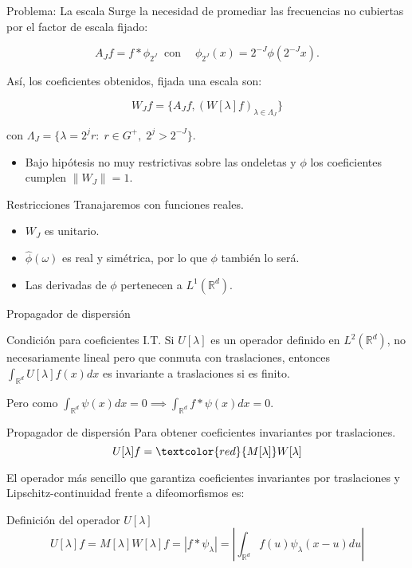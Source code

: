 \documentclass[aspectratio=43]{beamer}
\begin{document}
\begin{frame}{Problema: La escala}
  Surge la necesidad de promediar las frecuencias no cubiertas por el factor de escala fijado:

  \begin{equation*}
    A_Jf=f \ast \phi_ {2^J} \; \; \text{con} \quad \; \phi_ {2^J}(x)=2^{-J} \phi(2^{-J}x).
  \end{equation*}

  Así, los coeficientes obtenidos, fijada una escala son:

  $$W_J f=\lbrace A_Jf,(W[\lambda]f)_{\lambda \in \Lambda_J} \rbrace$$

  con $\Lambda_J=\lbrace \lambda=2^jr:\;r\in G^{+}, \; 2^j>2^{-J}\rbrace$.

  \begin{itemize}
    \item Bajo hipótesis no muy restrictivas sobre las ondeletas y $\phi$ los coeficientes cumplen $\| W_J \|=1$.
  \end{itemize}
\end{frame}

\begin{frame}{Restricciones}
  Tranajaremos con funciones reales.
  \begin{itemize}
    \item $W_J$ es unitario.
    \item $\widehat{\phi}(\omega)$ es real y simétrica, por lo que $\phi$ también lo será.
    \item Las derivadas de $\phi$ pertenecen a $L^1(\mathbb{R}^d)$.
  \end{itemize}
\end{frame}

\begin{frame}{Propagador de dispersión}

  \begin{alertblock}{Condición para coeficientes I.T.}
    Si $U[\lambda]$ es un operador definido en $L^2(\mathbb{R}^d)$, no necesariamente lineal pero que conmuta con traslaciones, entonces $\int_{\mathbb{R}^d} U[\lambda]f(x)dx$ es invariante a traslaciones si es finito.
  \end{alertblock}
  \medskip
  Pero como $\int_{\mathbb{R}^d} \psi(x)dx=0 \implies \int_{\mathbb{R}^d} f \ast \psi(x) dx=0$.
\end{frame}

\begin{frame}{Propagador de dispersión}
  Para obtener coeficientes invariantes por traslaciones.
  $$U[\lambda]f= \textcolor{red}{M[\lambda]} W[\lambda]$$

  \medskip

  El operador más sencillo que garantiza coeficientes invariantes por traslaciones y Lipschitz-continuidad frente a difeomorfismos es:

  \begin{block}{Definición del operador $U[\lambda]$}
    $$U[\lambda]f=M[\lambda]W[\lambda]f=|f \ast \psi_\lambda|=\left | \int_{\mathbb{R}^d} f(u)\psi_\lambda(x-u) du \right|$$
  \end{block}
\end{frame}
\end{document}
